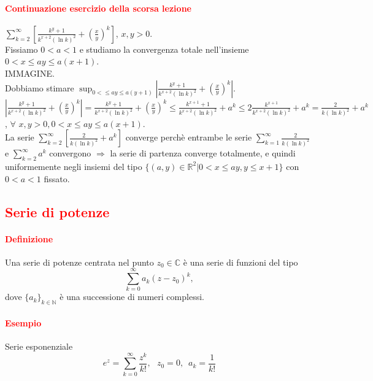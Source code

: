 \documentclass{article}
\newcommand{\R}{\mathbb{R}}
\newcommand{\C}{\mathbb{C}}
\newcommand{\N}{\mathbb{N}}
\begin{document}
\paragraph{\textcolor{red}{Continuazione esercizio della scorsa lezione}}
$\sum_{k=2}^{\infty}\left[ \frac{k^y+1}{k^{x+2}(\ln k)^2} +\left(\frac{x}{y}\right)^k\right]$, $x,y >0$.\\
Fissiamo $0 < a  < 1$  e studiamo la convergenza totale nell'insieme $0 <x \leq a y \leq a(x+1)$.\\
IMMAGINE.\\
Dobbiamo stimare $\sup_{0 < \leq ay \leq a(y+1)}| \frac{k^y+1}{k^{x+2}(\ln k)^2} +\left(\frac{x}{y}\right)^k|$.\\
$| \frac{k^y+1}{k^{x+2}(\ln k)^2} +\left(\frac{x}{y}\right)^k|= \frac{k^y+1}{k^{x+2}(\ln k)^2} +\left(\frac{x}{y}\right)^k \leq  \frac{k^{x+1}+1}{k^{x+2}(\ln k)^2}+a^k\leq 2\frac{k^{x+1}}{k^{x+2}(\ln k)^2}+a^k =\frac{2}{k(\ln k)^2}+a^k$, $\forall \,\, x,y >0, 0 < x \leq ay\leq a(x+1)$.\\
La serie $\sum_{k=2}^{\infty}\left[\frac{2}{k(\ln k)^2}+a^k\right]$ converge perchè entrambe le serie $\sum_{k=1}^{\infty}\frac{2}{k(\ln k)^2}$ e $\sum_{k=2}^{\infty}a^k$ convergono $\Rightarrow$ la serie di partenza converge totalmente, e quindi uniformemente negli insiemi del tipo $\{(a,y)\in \R^2|0<x\leq ay, y \leq x+1\}$ con $0 < a<1$ fissato.

\subsection{\textcolor{red}{Serie di potenze}}
\paragraph{\textcolor{red}{Definizione}}
Una serie di potenze centrata nel punto $z_0 \in \C$ è una serie di funzioni del tipo 
\begin{equation*}
    \sum_{k=0}^{\infty} a_k(z-z_0)^k,
\end{equation*}
dove $\{a_k\}_{k\in\N}$ è una successione di numeri complessi.

\paragraph{\textcolor{red}{Esempio}}
Serie esponenziale
\begin{equation*}
e^z=\sum_{k=0}^{\infty}\frac{z^k}{k!},\,\,\,\, z_0=0,\,\,\, a_k=\frac{1}{k!}
\end{equation*}
\end{document}
